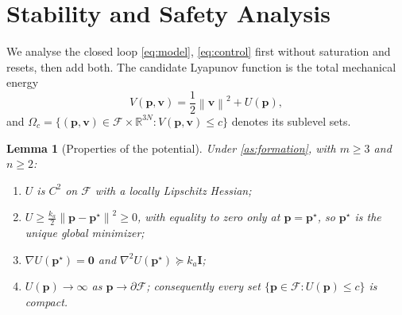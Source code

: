 \documentclass[11pt]{article}
\newtheorem{lemma}{Lemma}
\theoremstyle{definition}
\theoremstyle{remark}
\newcommand{\R}{\mathbb{R}}
\newcommand{\bp}{\mathbf{p}}
\newcommand{\bv}{\mathbf{v}}
\newcommand{\bI}{\mathbf{I}}
\newcommand{\norm}[1]{\left\lVert #1 \right\rVert}
\newcommand{\Free}{\mathcal{F}}
\begin{document}
\section{Stability and Safety Analysis}\label{sec:analysis}

We analyse the closed loop \eqref{eq:model}, \eqref{eq:control} first without
saturation and resets, then add both. The candidate Lyapunov function is the
total mechanical energy
\begin{equation}\label{eq:V}
  V(\bp,\bv)=\frac12\norm{\bv}^2+U(\bp),
\end{equation}
and $\Omega_c=\{(\bp,\bv)\in\Free\times\R^{3N}: V(\bp,\bv)\le c\}$ denotes its
sublevel sets.

\begin{lemma}[Properties of the potential]\label{lem:potential}
Under \cref{as:formation}, with $m\ge3$ and $n\ge2$:
\begin{enumerate}[label=(\roman*)]
  \item $U$ is $C^2$ on $\Free$ with a locally Lipschitz Hessian;
  \item $U\ge\frac{k_a}{2}\norm{\bp-\bp^\star}^2\ge0$, with equality to zero
    only at $\bp=\bp^\star$, so $\bp^\star$ is the unique global minimizer;
  \item $\nabla U(\bp^\star)=\mathbf{0}$ and $\nabla^2U(\bp^\star)\succeq k_a\bI$;
  \item $U(\bp)\to\infty$ as $\bp\to\partial\Free$; consequently every set
    $\{\bp\in\Free:U(\bp)\le c\}$ is compact.
\end{enumerate}
\end{lemma}
\end{document}
